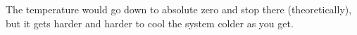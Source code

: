 The temperature would go down to absolute zero and stop there (theoretically), but it gets harder and harder to cool the system colder as you get.